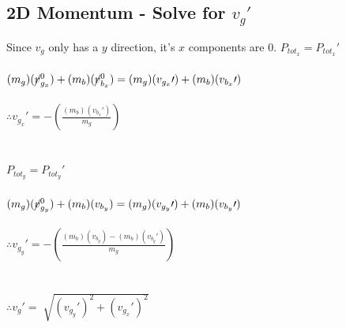 \documentclass{article}
\begin{document}
\begin{adjustwidth}{1cm}{0pt}
    \subsection*{2D Momentum - Solve for $v_{g}\prime$}
    \begin{adjustwidth}{1cm}{0pt}
        Since $v_{g}$ only has a $y$ direction, it's $x$ components are 0.\newline\newline
        $P_{tot_{x}} = P_{tot_{x}}\prime$ \\\\
        $(m_{g})(\cancel{v}_{g_{x}}^0) + (m_{b})(\cancel{v}_{b_{x}}^0) = (m_{g})(v_{g_{x}}\prime) + (m_{b})(v_{b_{x}}\prime)$ \\\\
        $\therefore v_{g_{x}}\prime = -\left(\frac{(m_{b})(v_{b_{x}}\prime)}{m_{g}}\right)$
        \\\\\\
        $P_{tot_{y}} = P_{tot_{y}}\prime$ \\\\
        $(m_{g})(\cancel{v}_{g_{y}}^0) + (m_{b})(v_{b_{y}}) = (m_{g})(v_{g_{y}}\prime) + (m_{b})(v_{b_{y}}\prime)$ \\\\
        $\therefore v_{g_{y}}\prime = -\left(\frac{(m_{b})(v_{b_{y}}) - (m_{b})(v_{b_{y}}\prime)}{m_{g}}\right)$
        \\\\\\
        $\therefore v_{g}\prime = \sqrt[]{{(v_{g_{y}}\prime)}^2 + {(v_{g_{x}}\prime)}^2}$ \\\\
    \end{adjustwidth}
\end{adjustwidth}


\end{document}
